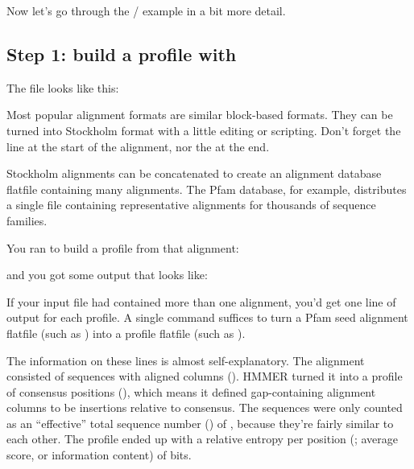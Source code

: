 Now let's go through the / example in a
bit more detail.

\subsection{Step 1: build a profile with }

The file  looks like this:


Most popular alignment formats are similar block-based formats. They
can be turned into Stockholm format with a little editing or
scripting. Don't forget the  line at the start
of the alignment, nor the \mono{//} at the end. 

Stockholm alignments can be concatenated to create an alignment
database flatfile containing many alignments. The Pfam database, for
example, distributes a single file containing representative
alignments for thousands of sequence families.

You ran  to build a profile from that
alignment:

   \vspace{1ex}
   \vspace{1ex}

and you got some output that looks like:


If your input file had contained more than one alignment, you'd get
one line of output for each profile. A single  command
suffices to turn a Pfam seed alignment flatfile (such as
) into a profile flatfile (such as
).

The information on these lines is almost self-explanatory. The
 alignment consisted of \BGLnseq{} sequences with
\BGLalen{} aligned columns (). HMMER turned it into a profile
of \BGLmlen{} consensus positions (), which means it
defined \BGLgaps{} gap-containing alignment columns to be insertions
relative to consensus. The \BGLnseq{} sequences were only counted as
an ``effective'' total sequence number () of
\BGLeffn{}, because they're fairly similar to each
other.
The profile ended up with a relative entropy per position
(; average score, or information content) of \BGLre{}
bits.

